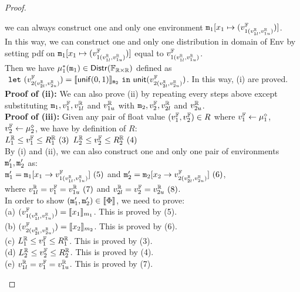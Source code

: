 \documentclass[a4paper,11pt]{article}
\begin{document}
\begin{proof}
\begin{itemize}
\begin{subproof}
	we can always construct one and only one environment $\mathtt{m}_1[x_1 \mapsto (v^{\mathbb{F}}_{1(v^{\mathbb{R}}_{1l}, v^{\mathbb{R}}_{1u})})]$.
	\\
	In this way, we can construct one and only one distribution in domain of Env 
	by setting pdf on 
	$\mathtt{m}_1[x_1 \mapsto (v^{\mathbb{F}}_{1(v^{\mathbb{R}}_{1l}, v^{\mathbb{R}}_{1u})})]$
	equal to 
	$v^{\mathbb{F}}_{1(v^{\mathbb{R}}_{1l}, v^{\mathbb{R}}_{1u})}$.
	\\
	Then we have $\mu^*_1(\mathtt{m}_1) \in \mathsf{Distr}(\mathbb{F}_{\mathbb{R} \times \mathbb{R}})$ defined as 
	$~\mathtt{let}~ (v^{\mathbb{F}}_{2(v^{\mathbb{R}}_{2l}, v^{\mathbb{R}}_{2u})}) 
	= \llbracket \mathsf{unif}(0, 1) \rrbracket_{\mathtt{m}_2} 
	~\mathtt{in}~
	\mathsf{unit}(v^{\mathbb{F}}_{2(v^{\mathbb{R}}_{2l}, v^{\mathbb{R}}_{2u})})$.
	In this way, (i) are proved.
	\\
	\textbf{Proof of (ii):} We can also prove (ii) by repeating every steps above except substituting $\mathtt{m}_1, v^{\mathbb{F}}_1, v^{\mathbb{R}}_{1l}$ and $v^{\mathbb{R}}_{1u}$ with $\mathtt{m}_2, v^{\mathbb{F}}_2, v^{\mathbb{R}}_{2l}$ and $v^{\mathbb{R}}_{2u}$.
	\\
	\textbf{Proof of (iii):} Given any pair of float value $(v^{\mathbb{F}}_1, v^{\mathbb{F}}_2) \in R$ where 
	$v^{\mathbb{F}}_1 \leftarrow \mu_1^{\diamond}$, $v^{\mathbb{F}}_2 \leftarrow \mu_2^{\diamond}$, we have by definition of $R$:
	\\
	$L^{\mathbb{R}}_1 \leq v^{\mathbb{F}}_1 \leq R^{\mathbb{R}}_1 ~ (3)$
	$L^{\mathbb{R}}_2 \leq v^{\mathbb{F}}_2 \leq R^{\mathbb{R}}_2 ~ (4)$
	\\
	By (i) and (ii), we can also construct one and only one pair of environments $\mathtt{m}_1', \mathtt{m}_2'$ as:
	\\
	$\mathtt{m}_1' = \mathtt{m}_1[x_1 \to v^{\mathbb{F}}_{1(v^{\mathbb{R}}_{1l}, v^{\mathbb{R}}_{1u})}] ~ (5)$ and
	$\mathtt{m}_2' = \mathtt{m}_2[x_2 \to v^{\mathbb{F}}_{2(v^{\mathbb{R}}_{2l}, v^{\mathbb{R}}_{2u})}] ~ (6)$,
	\\
	where $v^{\mathbb{R}}_{1l} = v^{\mathbb{F}}_1 = v^{\mathbb{R}}_{1u} ~ (7)$ and $v^{\mathbb{R}}_{2l} = v^{\mathbb{F}}_2 = v^{\mathbb{R}}_{2u} ~ (8)$.
	\\
	In order to show $(\mathtt{m}_1', \mathtt{m}_2') \in \llbracket \Phi \rrbracket$, we need to prove:
	\\
	(a)	$(v^{\mathbb{F}}_{1(v^{\mathbb{R}}_{1l}, v^{\mathbb{R}}_{1u})}) = \llbracket x_1 \rrbracket_{m_1}$.
	This is proved by (5).
	\\
	(b) $(v^{\mathbb{F}}_{2(v^{\mathbb{R}}_{2l}, v^{\mathbb{R}}_{2u})}) = \llbracket x_2 \rrbracket_{m_2}$.
	This is proved by (6).
	\\
	(c) $L^{\mathbb{R}}_1 \leq v^{\mathbb{F}}_1 \leq R^{\mathbb{R}}_1$.
	This is proved by (3).
	\\
	(d) $L^{\mathbb{R}}_2 \leq v^{\mathbb{F}}_2 \leq R^{\mathbb{R}}_2$.
	This is proved by (4).
	\\
	(e) $v^{\mathbb{R}}_{1l} = v^{\mathbb{F}}_1 = v^{\mathbb{R}}_{1u}$.
	This is proved by (7).
	\\ 

\end{subproof}
\end{itemize}
\end{proof}
\end{document}
